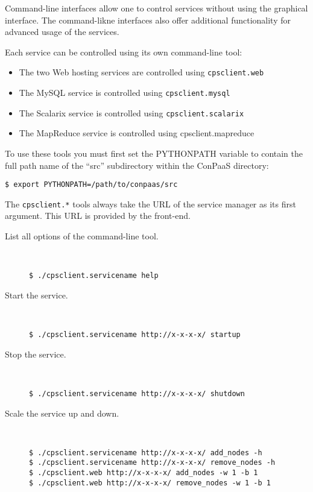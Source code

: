 \documentclass[10pt]{article}
\begin{document}
Command-line interfaces allow one to control services without using
the graphical interface. The command-likne interfaces also offer
additional functionality for advanced usage of the services.

Each service can be controlled using its own command-line tool:

\begin{itemize}
\item The two Web hosting services are controlled using \texttt{cpsclient.web}
\item The MySQL service is controlled using \texttt{cpsclient.mysql}
\item The Scalarix service is controlled using \texttt{cpsclient.scalarix}
\item The MapReduce service is controlled using cpsclient.mapreduce
\end{itemize}

To use these tools you must first set the PYTHONPATH variable to
contain the full path name of the ``src'' subdirectory within the
ConPaaS directory:
\begin{verbatim}
$ export PYTHONPATH=/path/to/conpaas/src
\end{verbatim}

The \texttt{cpsclient.*} tools always take the URL of the service
manager as its first argument. This URL is provided by the front-end.

\vspace{1em}

\begin{description}
\item[List all options of the command-line tool.]~
\begin{verbatim}
$ ./cpsclient.servicename help
\end{verbatim}

\item[Start the service.]~
\begin{verbatim}
$ ./cpsclient.servicename http://x-x-x-x/ startup
\end{verbatim}

\item[Stop the service.]~
\begin{verbatim}
$ ./cpsclient.servicename http://x-x-x-x/ shutdown
\end{verbatim}

\item[Scale the service up and down.]~
\begin{verbatim}
$ ./cpsclient.servicename http://x-x-x-x/ add_nodes -h
$ ./cpsclient.servicename http://x-x-x-x/ remove_nodes -h
$ ./cpsclient.web http://x-x-x-x/ add_nodes -w 1 -b 1
$ ./cpsclient.web http://x-x-x-x/ remove_nodes -w 1 -b 1
\end{verbatim}

\end{description}
\end{document}
